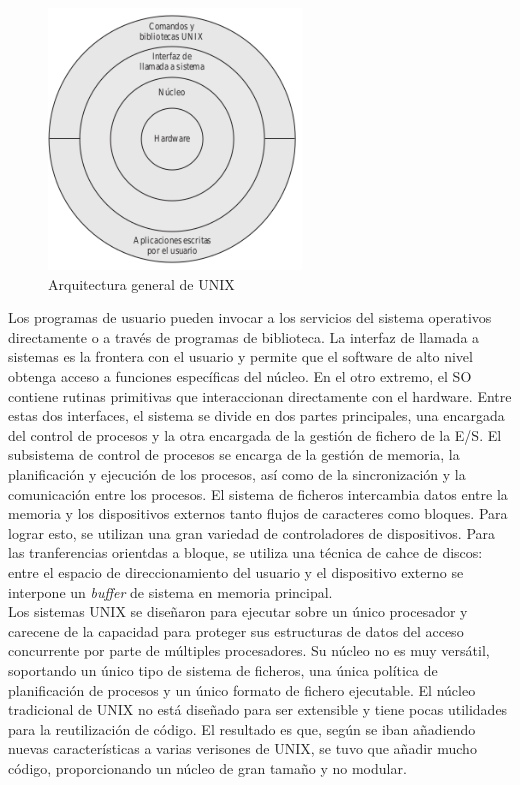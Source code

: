 \documentclass{article}
\begin{document}
				\begin{figure}
				\caption{Arquitectura general de UNIX}
				\label{figura23:arquitectura unix}
				\centering
				\includegraphics[width=0.6\textwidth, scale=1]{figura23.png}
				\end{figure}
				
				Los programas de usuario pueden invocar a los servicios del sistema operativos directamente o a través de programas de biblioteca. La interfaz de llamada a sistemas es la frontera con el usuario y permite que el software de alto nivel obtenga acceso a funciones específicas del núcleo. En el otro extremo, el SO contiene rutinas primitivas que interaccionan directamente con el hardware. Entre estas dos interfaces, el sistema se divide en dos partes principales, una encargada del control de procesos y la otra encargada de la gestión de fichero de la E/S. El subsistema de control de procesos se encarga de la gestión de memoria, la planificación y ejecución de los procesos, así como de la sincronización y la comunicación entre los procesos. El sistema de ficheros intercambia datos entre la memoria y los dispositivos externos tanto  flujos de caracteres como bloques. Para lograr esto, se utilizan una gran variedad de controladores de dispositivos. Para las tranferencias orientdas a bloque, se utiliza una técnica de cahce de discos: entre el espacio de direccionamiento del usuario y el dispositivo externo se interpone un \textit{buffer} de sistema en memoria principal. \\
				
				Los sistemas UNIX se diseñaron para ejecutar sobre un único procesador y carecene de la capacidad para proteger sus estructuras de datos del acceso concurrente por parte de múltiples procesadores. Su núcleo no es muy versátil, soportando un único tipo de sistema de ficheros, una única política de planificación de procesos y un único formato de fichero ejecutable. El núcleo tradicional de UNIX no está diseñado para ser extensible y tiene pocas utilidades para la reutilización de código. El resultado es que, según se iban añadiendo nuevas características a varias verisones de UNIX, se tuvo que añadir mucho código, proporcionando un núcleo de gran tamaño y no modular.
				
\end{document}
